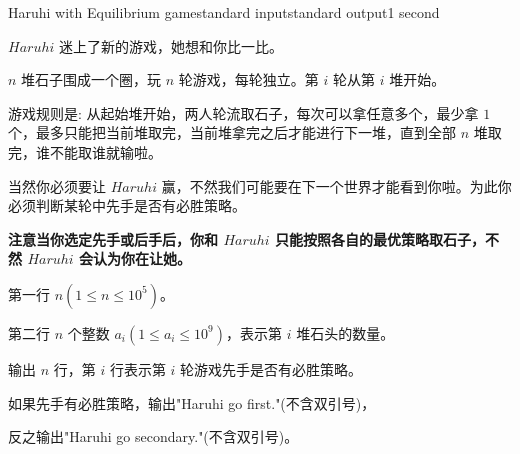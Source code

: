 \begin{problem}{Haruhi with Equilibrium game}{standard input}{standard output}{1 second}

$Haruhi$ 迷上了新的游戏，她想和你比一比。

$n$ 堆石子围成一个圈，玩 $n$ 轮游戏，每轮独立。第 $i$ 轮从第 $i$ 堆开始。

游戏规则是: 从起始堆开始，两人轮流取石子，每次可以拿任意多个，最少拿 $1$ 个，最多只能把当前堆取完，当前堆拿完之后才能进行下一堆，直到全部 $n$ 堆取完，谁不能取谁就输啦。

当然你必须要让 $Haruhi$ 赢，不然我们可能要在下一个世界才能看到你啦。为此你必须判断某轮中先手是否有必胜策略。

\textbf{注意当你选定先手或后手后，你和 $Haruhi$ 只能按照各自的最优策略取石子，不然 $Haruhi$ 会认为你在让她。}

\InputFile

第一行 $n(1 \leq n \leq 10^5)$。

第二行 $n$ 个整数 $a_i(1 \leq a_i \leq 10^9)$，表示第 $i$ 堆石头的数量。

\OutputFile

输出 $n$ 行，第 $i$ 行表示第 $i$ 轮游戏先手是否有必胜策略。

如果先手有必胜策略，输出"Haruhi go first."(不含双引号)，

反之输出"Haruhi go secondary."(不含双引号)。

\Example
\begin{example}
%
\end{example}
\end{problem}

